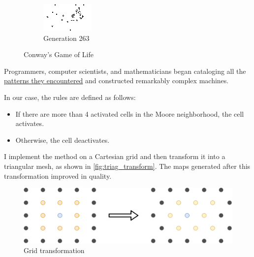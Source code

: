 \documentclass[../main.tex]{subfiles}
\begin{document}
\begin{figure}[H]
\begin{subfigure}{0.35\textwidth}
        \centering
        \includegraphics[width=\textwidth]{IMAGES/part5/CGOF_2.png}
        \caption{Generation 263}
    \end{subfigure}
    \caption{Conway's Game of Life}
    \label{fig:CGOF}
\end{figure}

Programmers, computer scientists, and mathematicians began cataloging all the \href{https://en.wikipedia.org/wiki/Conway's_Game_of_Life#Examples_of_patterns}{patterns they encountered} and constructed remarkably complex machines.

\vspace{1em}

In our case, the rules are defined as follows:
\begin{itemize}  
    \item If there are more than 4 activated cells in the Moore neighborhood, the cell activates. 
    \item Otherwise, the cell deactivates. 
\end{itemize}

\vspace{0.5em}

I implement the method on a Cartesian grid and then transform it into a triangular mesh, as shown in \autoref{fig:triag_transform}. The maps generated after this transformation improved in quality.

\begin{figure}[H]
	\centering
	\includegraphics[width=0.6\linewidth]{IMAGES/part5/grid_transform_map_generation.png}
	\caption{Grid transformation}
	\label{fig:triag_transform}
\end{figure}
\end{document}
